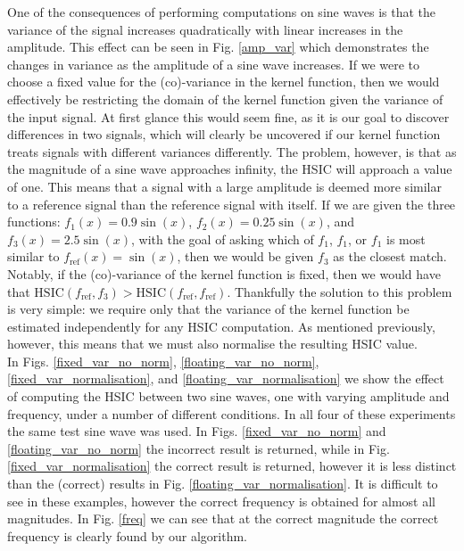 One of the consequences of performing computations on sine waves is that the variance of the signal increases quadratically with linear increases in the amplitude. This effect can be seen in Fig. \ref{amp_var} which demonstrates the changes in variance as the amplitude of a sine wave increases. If we were to choose a fixed value for the (co)-variance in the kernel function, then we would effectively be restricting the domain of the kernel function given the variance of the input signal. At first glance this would seem fine, as it is our goal to discover differences in two signals, which will clearly be uncovered if our kernel function treats signals with different variances differently. The problem, however, is that as the magnitude of a sine wave approaches infinity, the HSIC will approach a value of one. This means that a signal with a large amplitude is deemed more similar to a reference signal than the reference signal with itself. If we are given the three functions: $f_1(x) = 0.9\sin(x)$, $f_2(x) = 0.25\sin(x)$, and $f_3(x) = 2.5\sin(x)$, with the goal of asking which of $f_1$, $f_1$, or $f_1$ is most similar to $f_{\text{ref}}(x) = \sin(x)$, then we would be given $f_3$ as the closest match. Notably, if the (co)-variance of the kernel function is fixed, then we would have that $\text{HSIC}(f_{\text{ref}}, f_3) > \text{HSIC}(f_{\text{ref}}, f_{\text{ref}})$. Thankfully the solution to this problem is very simple: we require only that the variance of the kernel function be estimated independently for any HSIC computation. As mentioned previously, however, this means that we must also normalise the resulting HSIC value.  \\

In Figs. \ref{fixed_var_no_norm}, \ref{floating_var_no_norm}, \ref{fixed_var_normalisation}, and \ref{floating_var_normalisation} we show the effect of computing the HSIC between two sine waves, one with varying amplitude and frequency, under a number of different conditions. In all four of these experiments the same test sine wave was used. In Figs. \ref{fixed_var_no_norm} and \ref{floating_var_no_norm} the incorrect result is returned, while in Fig. \ref{fixed_var_normalisation} the correct result is returned, however it is less distinct than the (correct) results in Fig. \ref{floating_var_normalisation}. It is difficult to see in these examples, however the correct frequency is obtained for almost all magnitudes. In Fig. \ref{freq} we can see that at the correct magnitude the correct frequency is clearly found by our algorithm. 



